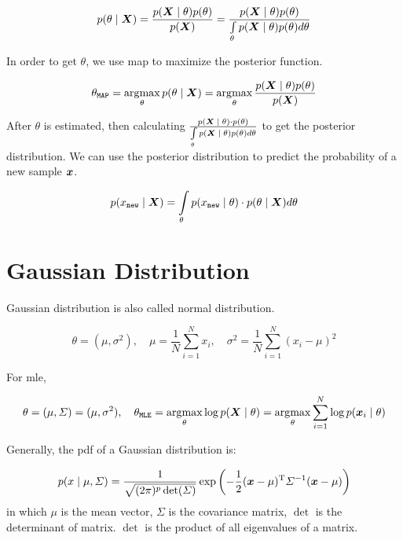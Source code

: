 \begin{equation}
	p\giventhat{\theta}{\vX} = \frac{p\giventhat{\vX}{\theta} p(\theta)}{p(\vX)}  =  \frac{p\giventhat{\vX}{\theta} p(\theta)}{\int\limits_{\theta} p\giventhat{\vX}{\theta} p(\theta) d\theta}
\end{equation}


In order to get \(\theta\), we use \gls{map}  to maximize the posterior function.

\begin{equation}
	\theta_{\mathtt{MAP}} = \argmax_{\theta} p\giventhat{\theta}{\vX} = \argmax_{\theta} \frac{p\giventhat{\vX}{\theta} p(\theta)}{p(\vX)}
\end{equation}


After \(\theta\) is estimated, then  calculating \(\frac{p\giventhat{\vX}{\theta} \cdot p(\theta)}{\int\limits_{\theta} p\giventhat{\vX}{\theta} p(\theta) d\theta}\) to get the posterior distribution.
We can use the posterior distribution to predict the probability of a new sample \(\vx\).


\begin{equation}
	p \giventhat{x_{\mathtt{new}}}{\vX}  = \int\limits_{\theta} p\giventhat{x_{\mathtt{new}}}{\theta} \cdot p\giventhat{\theta}{\vX} d\theta
\end{equation}

\section{Gaussian Distribution}

Gaussian distribution is also called normal distribution.

\begin{equation}
	\theta = (\mu, \sigma^2), \quad \mu = \frac{1}{N} \sum_{i=1}^{N} x_i, \quad \sigma^2 = \frac{1}{N} \sum_{i=1}^{N} (x_i - \mu)^2
\end{equation}

For \gls{mle},

\begin{equation}
	\theta = (\mu, \Sigma) = (\mu, \sigma^2), \quad \theta_{\mathtt{MLE}} = \argmax_{\theta} \log p\giventhat{\vX}{\theta} = \argmax_{\theta} \sum_{i=1}^{N} \log p\giventhat{\vx_i}{\theta}
\end{equation}


Generally, the \gls{pdf} of a Gaussian distribution is:

\begin{equation}
	p\giventhat{x}{\mu, \Sigma} =  \frac{1}{\sqrt{(2\pi)^p \det(\Sigma)}} \exp\left(-\frac{1}{2} (\vx - \mu)\transp \Sigma^{-1} (\vx - \mu)\right)
\end{equation}
in which \(\mu\) is the mean vector, \(\Sigma\) is the covariance matrix, \(\det\) is the determinant of matrix.
\(\det\)  is the product of all eigenvalues of a matrix.


